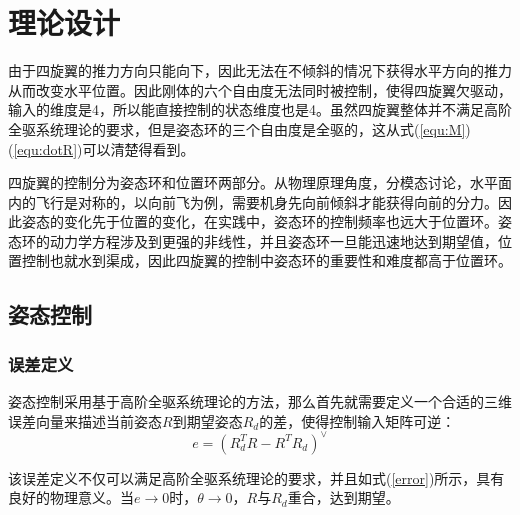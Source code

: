 \chapter{理论设计}  
由于四旋翼的推力方向只能向下，因此无法在不倾斜的情况下获得水平方向的推力从而改变水平位置。因此刚体的六个自由度无法同时被控制，使得四旋翼欠驱动，输入的维度是4，所以能直接控制的状态维度也是4。虽然四旋翼整体并不满足高阶全驱系统理论的要求，但是姿态环的三个自由度是全驱的，这从式(\ref{equ:M})(\ref{equ:dotR})可以清楚得看到。

四旋翼的控制分为姿态环和位置环两部分。从物理原理角度，分模态讨论，水平面内的飞行是对称的，以向前飞为例，需要机身先向前倾斜才能获得向前的分力。因此姿态的变化先于位置的变化，在实践中，姿态环的控制频率也远大于位置环。姿态环的动力学方程涉及到更强的非线性，并且姿态环一旦能迅速地达到期望值，位置控制也就水到渠成，因此四旋翼的控制中姿态环的重要性和难度都高于位置环。

\section{姿态控制}

\subsection*{误差定义}
姿态控制采用基于高阶全驱系统理论的方法，那么首先就需要定义一个合适的三维误差向量来描述当前姿态$R$到期望姿态$R_d$的差，使得控制输入矩阵可逆：
\begin{equation}
    e=(R_d^TR-R^TR_d)^\vee
\end{equation}

该误差定义不仅可以满足高阶全驱系统理论的要求，并且如式(\ref{error})所示，具有良好的物理意义。当$e\to 0$时，$\theta \to 0$，$R$与$R_d$重合，达到期望。

